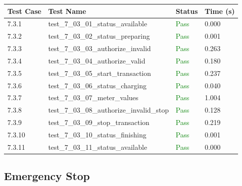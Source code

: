\documentclass{article}
\begin{document}
\begin{longtable}{p{} p{} p{} p{}}
\toprule
\textbf{Test Case} & \textbf{Test Name} & \textbf{Status} & \textbf{Time (s)} \\
\midrule
\endhead
7.3.1 & test\_7\_03\_01\_status\_available & \textcolor{green}{Pass} & 0.000 \\
7.3.2 & test\_7\_03\_02\_status\_preparing & \textcolor{green}{Pass} & 0.001 \\
7.3.3 & test\_7\_03\_03\_authorize\_invalid & \textcolor{green}{Pass} & 0.263 \\
7.3.4 & test\_7\_03\_04\_authorize\_valid & \textcolor{green}{Pass} & 0.180 \\
7.3.5 & test\_7\_03\_05\_start\_transaction & \textcolor{green}{Pass} & 0.237 \\
7.3.6 & test\_7\_03\_06\_status\_charging & \textcolor{green}{Pass} & 0.040 \\
7.3.7 & test\_7\_03\_07\_meter\_values & \textcolor{green}{Pass} & 1.004 \\
7.3.8 & test\_7\_03\_08\_authorize\_invalid\_stop & \textcolor{green}{Pass} & 0.128 \\
7.3.9 & test\_7\_03\_09\_stop\_transaction & \textcolor{green}{Pass} & 0.219 \\
7.3.10 & test\_7\_03\_10\_status\_finishing & \textcolor{green}{Pass} & 0.001 \\
7.3.11 & test\_7\_03\_11\_status\_available & \textcolor{green}{Pass} & 0.000 \\
\bottomrule
\end{longtable}
\subsection{Emergency Stop}
\end{document}
